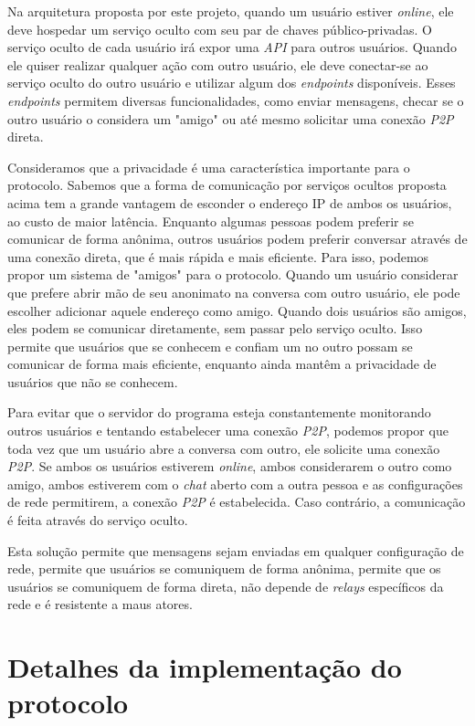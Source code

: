 Na arquitetura proposta por este projeto, quando um usuário estiver \textit{online}, ele deve hospedar um serviço oculto com seu par de chaves público-privadas. O serviço oculto de cada usuário irá expor uma \textit{API} para outros usuários. Quando ele quiser realizar qualquer ação com outro usuário, ele deve conectar-se ao serviço oculto do outro usuário e utilizar algum dos \textit{endpoints} disponíveis. Esses \textit{endpoints} permitem diversas funcionalidades, como enviar mensagens, checar se o outro usuário o considera um "amigo" ou até mesmo solicitar uma conexão \textit{P2P} direta.

Consideramos que a privacidade é uma característica importante para o protocolo. Sabemos que a forma de comunicação por serviços ocultos proposta acima tem a grande vantagem de esconder o endereço IP de ambos os usuários, ao custo de maior latência. Enquanto algumas pessoas podem preferir se comunicar de forma anônima, outros usuários podem preferir conversar através de uma conexão direta, que é mais rápida e mais eficiente. Para isso, podemos propor um sistema de "amigos" para o protocolo. Quando um usuário considerar que prefere abrir mão de seu anonimato na conversa com outro usuário, ele pode escolher adicionar aquele endereço como amigo. Quando dois usuários são amigos, eles podem se comunicar diretamente, sem passar pelo serviço oculto. Isso permite que usuários que se conhecem e confiam um no outro possam se comunicar de forma mais eficiente, enquanto ainda mantêm a privacidade de usuários que não se conhecem.

Para evitar que o servidor do programa esteja constantemente monitorando outros usuários e tentando estabelecer uma conexão \textit{P2P}, podemos propor que toda vez que um usuário abre a conversa com outro, ele solicite uma conexão \textit{P2P}. Se ambos os usuários estiverem \textit{online}, ambos considerarem o outro como amigo, ambos estiverem com o \textit{chat} aberto com a outra pessoa e as configurações de rede permitirem, a conexão \textit{P2P} é estabelecida. Caso contrário, a comunicação é feita através do serviço oculto.

Esta solução permite que mensagens sejam enviadas em qualquer configuração de rede, permite que usuários se comuniquem de forma anônima, permite que os usuários se comuniquem de forma direta, não depende de \textit{relays} específicos da rede e é resistente a maus atores.

\section{Detalhes da implementação do protocolo}

